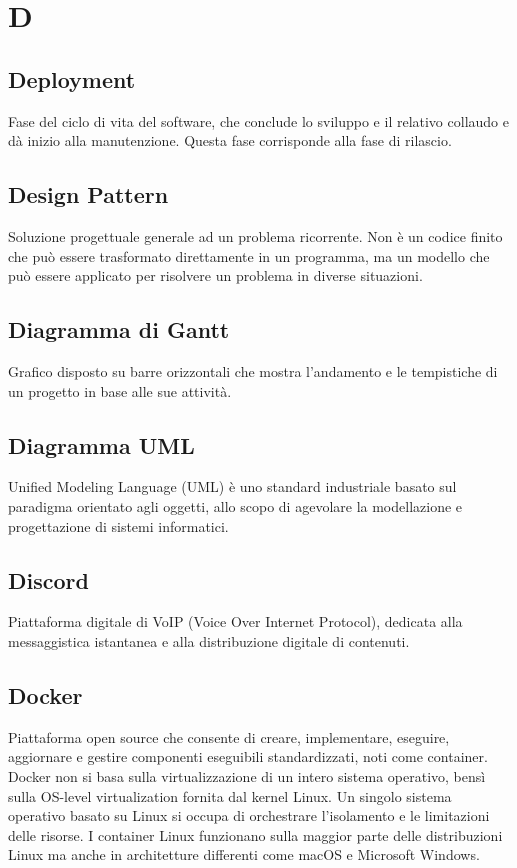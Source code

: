 \documentclass[12pt]{article}
\begin{document}
	\section{D}
		\subsection{Deployment}
		Fase del ciclo di vita del software, che conclude lo sviluppo e il relativo collaudo e dà inizio alla manutenzione. Questa fase corrisponde alla fase di rilascio.
		\subsection{Design Pattern}
		Soluzione progettuale generale ad un problema ricorrente. Non è un codice finito che può essere trasformato direttamente in un programma, ma un modello che può essere applicato per risolvere un problema in diverse situazioni.
		\subsection{Diagramma di Gantt}
		Grafico disposto su barre orizzontali che mostra l'andamento e le tempistiche di un progetto in base alle sue attività.
		\subsection{Diagramma UML}
		Unified Modeling Language (UML) è uno standard industriale basato sul paradigma orientato agli oggetti, allo scopo di agevolare la modellazione e progettazione di sistemi informatici.
		\subsection{Discord}
		Piattaforma digitale di VoIP (Voice Over Internet Protocol), dedicata alla messaggistica istantanea e alla distribuzione digitale di contenuti.
		\subsection{Docker}
		Piattaforma open source che consente di creare, implementare, eseguire, aggiornare e gestire componenti eseguibili standardizzati, noti come container. Docker non si basa sulla virtualizzazione di un intero sistema operativo, bensì sulla OS-level virtualization fornita dal kernel Linux. Un singolo sistema operativo basato su Linux si occupa di orchestrare l'isolamento e le limitazioni delle risorse. I container Linux funzionano sulla maggior parte delle distribuzioni Linux ma anche in architetture differenti come macOS e Microsoft Windows.
\end{document}
